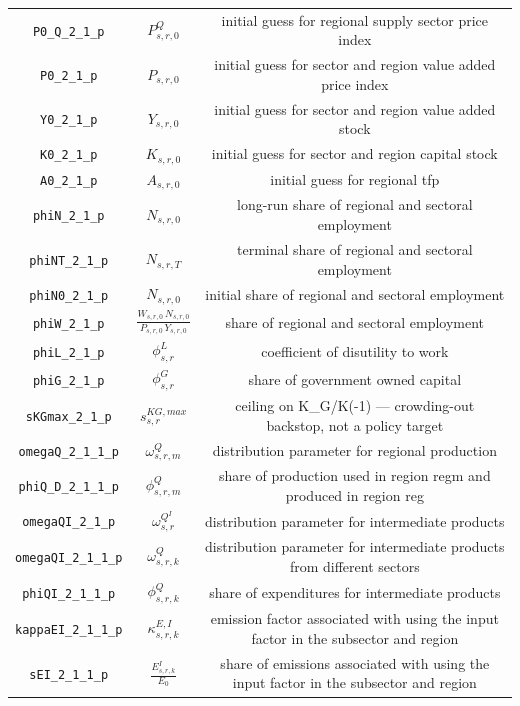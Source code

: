 \begin{center}
\begin{longtable}{ccc}
\texttt{P0\_Q\_2\_1\_p} & ${P^Q_{s,r,0}}$ & initial guess for regional supply sector price index\\
\texttt{P0\_2\_1\_p} & ${P_{s,r,0}}$ & initial guess for sector and region value added price index\\
\texttt{Y0\_2\_1\_p} & ${Y_{s,r,0}}$ & initial guess for sector and region value added stock\\
\texttt{K0\_2\_1\_p} & ${K_{s,r,0}}$ & initial guess for sector and region capital stock\\
\texttt{A0\_2\_1\_p} & ${A_{s,r,0}}$ & initial guess for regional tfp\\
\texttt{phiN\_2\_1\_p} & ${N_{s,r,0}}$ & long-run share of regional and sectoral employment\\
\texttt{phiNT\_2\_1\_p} & ${N_{s,r,T}}$ & terminal share of regional and sectoral employment\\
\texttt{phiN0\_2\_1\_p} & ${N_{s,r,0}}$ & initial share of regional and sectoral employment\\
\texttt{phiW\_2\_1\_p} & $\frac{W_{s,r,0} \, N_{s,r,0}}{P_{s,r,0} \, Y_{s,r,0}}$ & share of regional and sectoral employment\\
\texttt{phiL\_2\_1\_p} & ${\phi^{L}_{s,r}}$ & coefficient of disutility to work\\
\texttt{phiG\_2\_1\_p} & ${\phi^{G}_{s,r}}$ & share of government owned capital\\
\texttt{sKGmax\_2\_1\_p} & ${s^{KG,max}_{s,r}}$ & ceiling on K\_G/K(-1) — crowding-out backstop, not a policy target\\
\texttt{omegaQ\_2\_1\_1\_p} & ${\omega^{Q}_{s,r,m}}$ & distribution parameter for regional production\\
\texttt{phiQ\_D\_2\_1\_1\_p} & ${\phi^{Q}_{s,r,m}}$ & share of production used in region regm and produced in region reg\\
\texttt{omegaQI\_2\_1\_p} & ${\omega^{Q^{I}}_{s,r}}$ & distribution parameter for intermediate products\\
\texttt{omegaQI\_2\_1\_1\_p} & ${\omega^{Q}_{s,r,k}}$ & distribution parameter for intermediate products from different sectors\\
\texttt{phiQI\_2\_1\_1\_p} & ${\phi^{Q}_{s,r,k}}$ & share of expenditures for intermediate products\\
\texttt{kappaEI\_2\_1\_1\_p} & ${\kappa^{E,I}_{s,r,k}}$ & emission factor associated with using the input factor in the subsector and region\\
\texttt{sEI\_2\_1\_1\_p} & ${\frac{E^{I}_{s,r,k}}{E_0}}$ & share of emissions associated with using the input factor in the subsector and region\\

\end{longtable}
\end{center}
